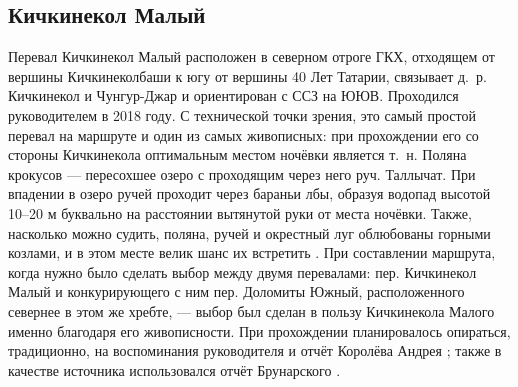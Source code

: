 \subsection{Кичкинекол Малый} 
Перевал Кичкинекол Малый расположен  в северном отроге ГКХ, отходящем от вершины Кичкинеколбаши к югу от вершины 40 Лет Татарии, связывает д.~р. Кичкинекол и Чунгур-Джар и ориентирован с ССЗ на ЮЮВ. Проходился руководителем в 2018 году. С технической точки зрения, это самый простой перевал на маршруте и один из самых живописных: при прохождении его со стороны Кичкинекола оптимальным местом ночёвки является т.~н. Поляна крокусов --- пересохшее озеро с проходящим через него руч. Таллычат. При впадении в озеро ручей проходит через бараньи лбы, образуя водопад высотой 10--20 м буквально на расстоянии вытянутой руки от места ночёвки. Также, насколько можно судить, поляна, ручей и окрестный луг облюбованы горными козлами, и в этом месте велик шанс их встретить \cite{Korolyov2018}. При составлении маршрута, когда нужно было сделать выбор между двумя перевалами: пер. Кичкинекол Малый и конкурирующего с ним пер. Доломиты Южный, расположенного севернее в этом же хребте, --- выбор был сделан в пользу Кичкинекола Малого именно благодаря его живописности. При прохождении планировалось опираться, традиционно, на воспоминания руководителя и отчёт Королёва Андрея \cite{Korolyov2018}; также в качестве источника использовался отчёт Брунарского \cite{Brunarsky2023}. 